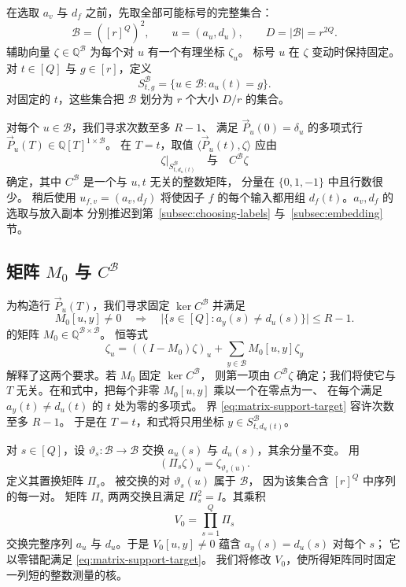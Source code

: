 在选取 $a_v$ 与 $d_f$ 之前，先取全部可能标号的完整集合：
\begin{equation}\label{eq:auxiliary-labels}
 \mathcal B=([r]^Q)^2,\qquad u=(a_u,d_u),\qquad D=|\mathcal B|=r^{2Q}.
\end{equation}
辅助向量 $\zeta\in\mathbb Q^{\mathcal B}$
为每个对 $u$ 有一个有理坐标 $\zeta_u$。
标号 $u$ 在 $\zeta$ 变动时保持固定。
对 $t\in[Q]$ 与 $g\in[r]$，定义
\begin{equation}\label{eq:auxiliary-groups}
 S^{\mathcal B}_{t,g}=\{u\in\mathcal B:a_u(t)=g\}.
\end{equation}
对固定的 $t$，这些集合把 $\mathcal B$ 划分为 $r$ 个大小
$D/r$ 的集合。

对每个 $u\in\mathcal B$，我们寻求次数至多 $R-1$、
满足 $\vec{P}_u(0)=\delta_u$ 的多项式行
$\vec{P}_u(T)\in\mathbb Q[T]^{1\times\mathcal B}$。
在 $T=t$，取值 $\langle \vec{P}_u(t), \zeta\rangle$
应由
\[
 \zeta|_{S^{\mathcal B}_{t,d_u(t)}}
 \quad\text{与}\quad C^{\mathcal B}\zeta
\]
确定，其中 $C^{\mathcal B}$ 是一个与 $u,t$ 无关的整数矩阵，
分量在 $\{0,1,-1\}$ 中且行数很少。
稍后使用 $u_{f,v}=(a_v,d_f)$ 将使因子 $f$
的每个输入都用组 $d_f(t)$。$a_v,d_f$ 的选取与放入副本
分别推迟到第~\ref{subsec:choosing-labels}
与~\ref{subsec:embedding} 节。

\subsection{矩阵 $M_0$ 与 $C^{\mathcal B}$}
为构造行 $\vec{P}_u(T)$，我们寻求固定 $\ker C^{\mathcal B}$
并满足
\begin{equation}\label{eq:matrix-support-target}
 M_0[u,y]\ne0\quad\Longrightarrow\quad
 \bigl|\{s\in[Q]:a_y(s)\ne d_u(s)\}\bigr|\le R-1.
\end{equation}
的矩阵 $M_0\in\mathbb Q^{\mathcal B\times\mathcal B}$。
恒等式
\begin{equation}\label{eq:coordinate-decomposition}
 \zeta_u=((I-M_0)\zeta)_u+
          \sum_{y\in\mathcal B}M_0[u,y]\zeta_y
\end{equation}
解释了这两个要求。若 $M_0$ 固定 $\ker C^{\mathcal B}$，
则第一项由 $C^{\mathcal B}\zeta$ 确定；我们将使它与 $T$
无关。在和式中，把每个非零 $M_0[u,y]$ 乘以一个在零点为一、
在每个满足 $a_y(t)\ne d_u(t)$ 的 $t$ 处为零的多项式。
界 \eqref{eq:matrix-support-target} 容许次数至多 $R-1$。
于是在 $T=t$，和式将只用坐标 $y\in S^{\mathcal B}_{t,d_u(t)}$。

对 $s\in[Q]$，设 $\vartheta_s:\mathcal B\to\mathcal B$
交换 $a_u(s)$ 与 $d_u(s)$，其余分量不变。
用
\[
 (\Pi_s\zeta)_u=\zeta_{\vartheta_s(u)}.
\]
定义其置换矩阵 $\Pi_s$。
被交换的对 $\vartheta_s(u)$ 属于 $\mathcal B$，
因为该集合含 $[r]^Q$ 中序列的每一对。
矩阵 $\Pi_s$ 两两交换且满足 $\Pi_s^2=I$。其乘积
\[
 V_0=\prod_{s=1}^Q\Pi_s
\]
交换完整序列 $a_u$ 与 $d_u$。于是
$V_0[u,y]\ne0$ 蕴含 $a_y(s)=d_u(s)$ 对每个 $s$；
它以零错配满足 \eqref{eq:matrix-support-target}。
我们将修改 $V_0$，使所得矩阵同时固定一列短的整数测量的核。

